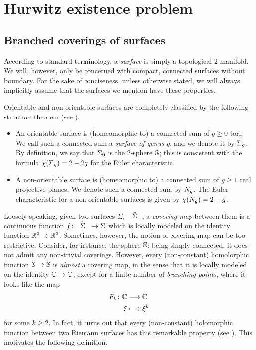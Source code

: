 
\chapter{Hurwitz existence problem}
\largevertices

\section{Branched coverings of surfaces}

According to standard terminology, a \emph{surface} is simply a topological $2$-manifold. We will, however, only be concerned with compact, connected surfaces without boundary. For the sake of conciseness, unless otherwise stated, we will always implicitly assume that the surfaces we mention have these properties.

Orientable and non-orientable surfaces are completely classified by the following structure theorem (see ).
\begin{itemize}
\item An orientable surface is (homeomorphic to) a connected sum of $g\ge 0$ tori. We call such a connected sum a \emph{surface of genus $g$}, and we denote it by $\Sigma_{g}$. By definition, we say that $\Sigma_{0}$ is the $2$-sphere $\mathbb{S}{}$; this is consistent with the formula $\chi(\Sigma_{g})=2-2g$ for the Euler characteristic.
\item A non-orientable surface is (homeomorphic to) a connected sum of $g\ge 1$ real projective planes. We denote such a connected sum by $N_{g}$. The Euler characteristic for a non-orientable surfaces is given by $\chi(N_{g})=2-g$.
\end{itemize}


Loosely speaking, given two surfaces $\Sigma$, $\tSigma$, a \emph{covering map} between them is a continuous function $\map{f}{\tSigma}{\Sigma}$ which is locally modeled on the identity function $\umap{\RR^2}{\RR^2}$. Sometimes, however, the notion of covering map can be too restrictive. Consider, for instance, the sphere $\mathbb{S}{}$: being simply connected, it does not admit any non-trivial coverings. However, every (non-constant) homolorphic function $\umap{\sphere{}}{\sphere{}}$ is \emph{almost} a covering map, in the sense that it is locally modeled on the identity $\umap{\CC}{\CC}$, except for a finite number of \emph{branching points}, where it looks like the map
\[
\begin{alignedat}{2} F_k\colon&&\mathbb{C}&\longrightarrow\mathbb{C}\\ &&\xi&\longmapsto\xi^k \end{alignedat}
\]
for some $k\ge 2$. In fact, it turns out that every (non-constant) holomorphic function between two Riemann surfaces has this remarkable property (see ). This motivates the following definition.

